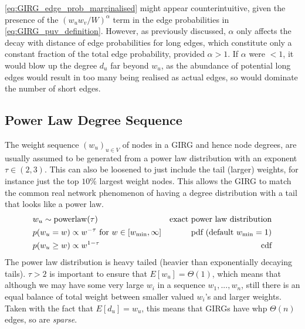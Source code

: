 \cref{eq:GIRG_edge_prob_marginalised} might appear counterintuitive, given the presence of the $(w_u w_v / W)^\alpha$ term in the edge probabilities in \cref{eq:GIRG_puv_definition}. However, as previously discussed, $\alpha$ only affects the decay with distance of edge probabilities for long edges, which constitute only a constant fraction of the total edge probability, provided $\alpha > 1$. If $\alpha$ were $<1$, it would blow up the degree $d_u$ far beyond $w_u$, as the abundance of potential long edges would result in too many being realised as actual edges, so would dominate the number of short edges.








\subsection{Power Law Degree Sequence} The weight sequence $(w_u)_{u \in V}$ of nodes in a GIRG and hence node degrees, are usually assumed to be generated from a power law distribution with an exponent $\tau \in (2, 3)$. This can also be loosened to just include the tail (larger) weights, for instance just the top $10\%$ largest weight nodes.
This allows the GIRG to match the common real network phenomenon of having a degree distribution with a tail that looks like a power law.
\begin{align}
& w_u \sim \operatorname{powerlaw}(\tau)
& \text{exact power law distribution}
\\
& p(w_u = w) \propto w^{-\tau} \text{ for } w \in [w_{\min }, \infty]
& \text{pdf (default $w_{\min } = 1$)}
\\
& p(w_u \geq w) \propto w^{1 - \tau}
& \text{cdf}
\end{align}
The power law distribution is heavy tailed (heavier than exponentially decaying tails). $\tau > 2$ is important to ensure that $E[w_u] = \Theta(1)$, which means that although we may have some very large $w_i$ in a sequence $w_1, ..., w_n$, still there is an equal balance of total weight between smaller valued $w_i$'s and larger weights. 
Taken with the fact that $E[d_u] = w_u$, this means that GIRGs have whp $\Theta(n)$ edges, so are \textit{sparse}.

